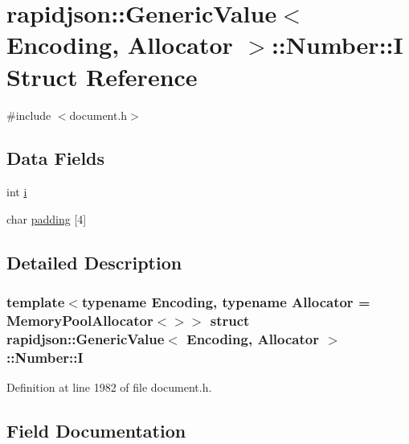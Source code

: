 \hypertarget{structrapidjson_1_1_generic_value_1_1_number_1_1_i}{}\section{rapidjson\+::Generic\+Value$<$ Encoding, Allocator $>$\+::Number\+::I Struct Reference}
\label{structrapidjson_1_1_generic_value_1_1_number_1_1_i}


{\ttfamily \#include $<$document.\+h$>$}

\subsection*{Data Fields}
\begin{DoxyCompactItemize}
\item 
int \mbox{\hyperlink{structrapidjson_1_1_generic_value_1_1_number_1_1_i_aee43f62c5529fb886642fb410ff93a05}{i}}
\item 
char \mbox{\hyperlink{structrapidjson_1_1_generic_value_1_1_number_1_1_i_ae0b11ea3695bf3abb23d5cef1f1517d2}{padding}} \mbox{[}4\mbox{]}
\end{DoxyCompactItemize}


\subsection{Detailed Description}
\subsubsection*{template$<$typename Encoding, typename Allocator = Memory\+Pool\+Allocator$<$$>$$>$\newline
struct rapidjson\+::\+Generic\+Value$<$ Encoding, Allocator $>$\+::\+Number\+::I}



Definition at line 1982 of file document.\+h.



\subsection{Field Documentation}
\mbox{\label{structrapidjson_1_1_generic_value_1_1_number_1_1_i_aee43f62c5529fb886642fb410ff93a05}} 
